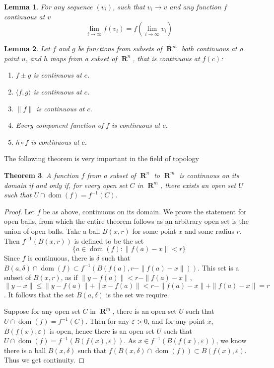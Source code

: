\documentclass{report}
\newtheorem{theorem}{Theorem}[chapter]
\newtheorem{lemma}[theorem]{Lemma}
\DeclareMathOperator{\real}{\mathbf{R}}
\DeclareMathOperator{\dom}{dom}
\begin{document}
\begin{lemma}
  For any sequence $(v_i)$, such that $v_i \to v$ and any function $f$ continuous at $v$
  \[ \lim_{i \to \infty} f(v_i) = f(\lim_{i \to \infty} v_i) \]
\end{lemma}

\begin{lemma}
  Let $f$ and $g$ be functions from subsets of $\real^m$ both continuous at a point $u$, and $h$ maps from a subset of $\real^n$, that is continuous at $f(c)$:

  \begin{enumerate}
    \item $f \pm g$ is continuous at $c$.
    \item $\langle f, g \rangle$ is continuous at $c$.
    \item $\|f\|$ is continuous at $c$.
    \item Every component function of $f$ is continuous at $c$.
    \item $h \circ f$ is continuous at $c$.
  \end{enumerate}
\end{lemma}

The following theorem is very important in the field of topology

\begin{theorem}
  A function $f$ from a subset of $\real^n$ to $\real^m$ is continuous on its domain if and only if, for every open set $C$ in $\real^m$, there exists an open set $U$ such that $U \cap \dom(f) = f^{-1}(C)$.
\end{theorem}
\begin{proof}
  Let $f$ be as above, continuous on its domain. We prove the statement for open balls, from which the entire theorem follows as an arbitrary open set is the union of open balls. Take a ball $B(x,r)$ for some point $x$ and some radius $r$. Then $f^{-1}(B(x,r))$ is defined to be the set
  \[ \{ a \in \dom(f) : \| f(a) - x \| < r \} \]
  Since $f$ is continuous, there is $\delta$ such that $B(a,\delta) \cap \dom(f) \subset f^{-1}(B(f(a),r - \|f(a) - x \|))$. This set is a subset of $B(x,r)$, as if $\| y - f(a) \| < r - \| f(a) - x \|$, $\| y - x\| \leq \| y - f(a) \| + \| x - f(a) \| < r - \| f(a) - x \| + \| f(a) - x \| = r$. It follows that the set $B(a,\delta)$ is the set we require.

  Suppose for any open set $C$ in $\real^m$, there is an open set $U$ such that $U \cap \dom(f) = f^{-1}(C)$. Then for any $\varepsilon > 0$, and for any point $x$, $B(f(x), \varepsilon)$ is open, hence there is an open set $U$ such that $U \cap \dom(f) = f^{-1}(B(f(x), \varepsilon))$. As $x \in f^{-1}(B(f(x), \varepsilon))$, we know there is a ball $B(x, \delta)$ such that $f(B(x, \delta) \cap \dom(f)) \subset B(f(x), \varepsilon)$. Thus we get continuity.
\end{proof}
\end{document}
